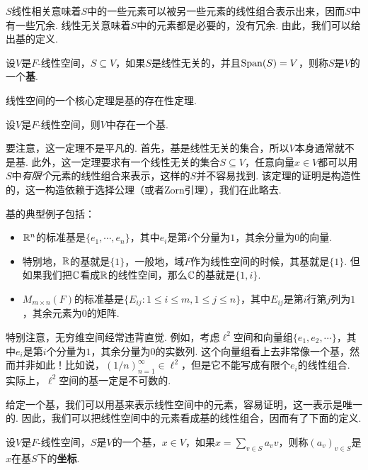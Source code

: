 $S$线性相关意味着$S$中的一些元素可以被另一些元素的线性组合表示出来，因而$S$中有一些冗余. 线性无关意味着$S$中的元素都是必要的，没有冗余. 由此，我们可以给出基的定义. 

\begin{definition}[基]
设$V$是$F$-线性空间，$S\subseteq V$，如果$S$是线性无关的，并且$\operatorname*{Span}(S)=V$，则称$S$是$V$的一个\textbf{基}. 
\end{definition}

线性空间的一个核心定理是基的存在性定理. 

\begin{theorem}[基的存在性定理]\label{thm:existence-of-basis}
设$V$是$F$-线性空间，则$V$中存在一个基. 
\end{theorem}

要注意，这一定理不是平凡的. 首先，基是线性无关的集合，所以$V$本身通常就不是基. 此外，这一定理要求有一个线性无关的集合$S\subseteq V$，任意向量$x\in V$都可以用$S$中\emph{有限个}元素的线性组合来表示，这样的$S$并不容易找到. 该定理的证明是构造性的，这一构造依赖于选择公理（或者Zorn引理），我们在此略去. 

基的典型例子包括：
\begin{itemize}
    \item $\mathbb{R}^n$的标准基是$\{e_1,\cdots,e_n\}$，其中$e_i$是第$i$个分量为$1$，其余分量为$0$的向量. 
    \item 特别地，$\mathbb{R}$的基就是$\{1\}$，一般地，域$F$作为线性空间的时候，其基就是$\{1\}$. 但如果我们把$\mathbb{C}$看成$\mathbb{R}$的线性空间，那么$\mathbb{C}$的基就是$\{1,i\}$.
    \item $M_{m\times n}(F)$的标准基是$\{E_{ij}:1\leq i\leq m,1\leq j\leq n\}$，其中$E_{ij}$是第$i$行第$j$列为$1$，其余元素为$0$的矩阵. 
\end{itemize}

特别注意，无穷维空间经常违背直觉. 例如，考虑$\ell^2$空间和向量组$\{e_1,e_2,\cdots\}$，其中$e_i$是第$i$个分量为$1$，其余分量为$0$的实数列. 这个向量组看上去非常像一个基，然而并非如此！比如说，$(1/n)_{n=1}^\infty\in\ell^2$，但是它不能写成有限个$e_i$的线性组合. 实际上，$\ell^2$空间的基一定是不可数的. 

给定一个基，我们可以用基来表示线性空间中的元素，容易证明，这一表示是唯一的. 因此，我们可以把线性空间中的元素看成基的线性组合，因而有了下面的定义. 

\begin{definition}[坐标]
设$V$是$F$-线性空间，$S$是$V$的一个基，$x\in V$，如果$x=\sum_{v\in S} a_v v$，则称$(a_v)_{v\in S}$是$x$在基$S$下的\textbf{坐标}. 
\end{definition}

